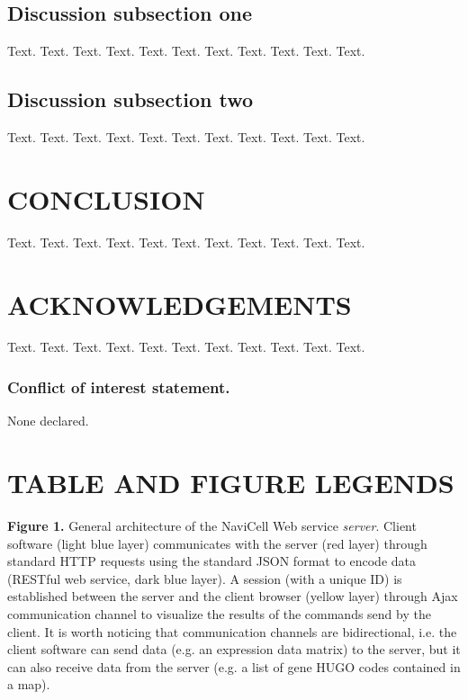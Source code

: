 \documentclass[a4,center,fleqn]{NAR}
\begin{document}
\subsection{Discussion subsection one}

Text. Text. Text. Text. Text. Text. Text. Text. Text. Text. Text.

\subsection{Discussion subsection two}

Text. Text. Text. Text. Text. Text. Text. Text. Text. Text. Text.

\section{CONCLUSION}

Text. Text. Text. Text. Text. Text. Text. Text. Text. Text. Text.

\section{ACKNOWLEDGEMENTS}

Text. Text. Text. Text. Text. Text. Text. Text. Text. Text. Text.


\subsubsection{Conflict of interest statement.} None declared.
\newpage



\section{TABLE AND FIGURE LEGENDS}

\textbf{Figure 1.} General architecture of the NaviCell Web service
\emph{server}. Client software (light blue layer) communicates with the server
(red layer) through standard HTTP requests using the standard JSON format to
encode data (RESTful web service, dark blue layer). A session (with a unique ID)
is established between the server and the client browser (yellow layer) through
Ajax communication channel to visualize the results of the commands send by the
client. It is worth noticing that communication channels are bidirectional, i.e.
the client software can send data (e.g. an expression data matrix) to the
server, but it can also receive data from the server (e.g. a list of gene HUGO
codes contained in a map).
\end{document}

